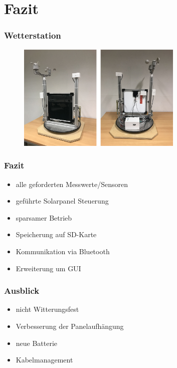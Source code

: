\documentclass{beamer}
\begin{document}
\section{Fazit}
\begin{frame}
	\frametitle{Wetterstation}
	 \begin{figure}[H]
    		\centering
    		\includegraphics[width=0.7\textwidth]{./img/Wetterstaion_fertig1.JPG}
  	 \end{figure}
\end{frame}

\begin{frame}
	\frametitle{Fazit}
	
	\begin{itemize}
		\item alle geforderten Messwerte/Sensoren
		\item geführte Solarpanel Steuerung
		\item sparsamer Betrieb
		\item Speicherung auf SD-Karte
		\item Kommunikation via Bluetooth	
		\item Erweiterung um GUI
	\end{itemize}

\end{frame}

\begin{frame}
	\frametitle{Ausblick}	
	\begin{itemize}
		\item nicht Witterungsfest
		\item Verbesserung der Panelaufhängung
		\item neue Batterie
		\item Kabelmanagement
	\end{itemize}

\end{frame}
\end{document}
